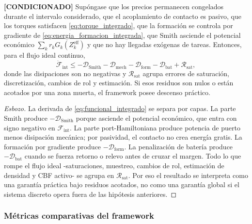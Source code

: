 \begin{proposicion} \textbf{[CONDICIONADO]}
\label{prop:descenso_integrado}
Supóngase que los precios permanecen congelados durante el intervalo considerado, que el
acoplamiento de contacto es pasivo, que los torques satisfacen
\eqref{eq:torque_integrado}, que la formación se controla por gradiente de
\eqref{eq:energia_formacion_integrada}, que Smith asciende el potencial económico
$\sum_k r_kG_k(Z_k^{\mathrm{eff}})$ y que no hay llegadas exógenas de tareas. Entonces,
para el flujo ideal continuo,
\begin{equation}
  \dot{\mathcal F}_{\mathrm{int}}
  \le
  -\mathcal D_{\mathrm{Smith}}
  -\mathcal D_{\mathrm{mech}}
  -\mathcal D_{\mathrm{form}}
  -\mathcal D_{\mathrm{bat}}
  +\mathcal R_{\mathrm{sat}},
  \label{eq:desigualdad_integrada}
\end{equation}
donde las disipaciones son no negativas y $\mathcal R_{\mathrm{sat}}$ agrupa errores de
saturación, discretización, cambios de rol y estimación. Si esos residuos son nulos o
están acotados por una zona muerta, el framework posee descenso práctico.
\end{proposicion}

\begin{proof}[Esbozo]
La derivada de \eqref{eq:funcional_integrado} se separa por capas. La parte Smith produce
$-\mathcal D_{\mathrm{Smith}}$ porque asciende el potencial económico, que entra con
signo negativo en $\mathcal F_{\mathrm{int}}$. La parte port-Hamiltoniana produce
potencia de puerto menos disipación mecánica; por pasividad, el contacto no crea energía
gratis. La formación por gradiente produce $-\mathcal D_{\mathrm{form}}$. La penalización
de batería produce $-\mathcal D_{\mathrm{bat}}$ cuando se fuerza retorno o relevo antes
de cruzar el margen. Todo lo que rompe el flujo ideal -saturaciones, muestreo, cambios de
rol, estimación de densidad y CBF activo- se agrupa en $\mathcal R_{\mathrm{sat}}$. Por
eso el resultado se interpreta como una garantía práctica bajo residuos acotados, no
como una garantía global si el sistema discreto opera fuera de las hipótesis anteriores.
\end{proof}

\subsubsection{Métricas comparativas del framework}


